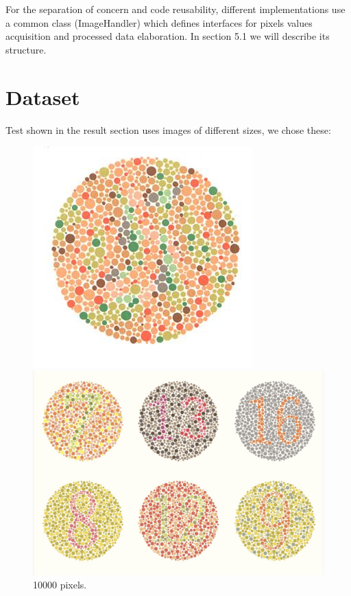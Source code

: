 \documentclass[10pt,twocolumn,letterpaper]{article}
\begin{document}
For the separation of concern and code reusability, different implementations use a common class (ImageHandler) which defines interfaces for pixels values acquisition and processed data elaboration. In section 5.1 we will describe its structure.

\section{Dataset}

Test shown in the  result section uses images of different sizes, we chose these:

\begin{figure}[H]
\begin{minipage}[b]{0.18\textwidth}
\centering
\includegraphics[width=\textwidth]{latex/100000p.jpg}
\caption{10000 pixels.}
\label{etichetta1}
\end{minipage}
\hfill
\begin{minipage}[b]{0.22\textwidth}
\centering
\includegraphics[width=\textwidth]{latex/1Mp.jpg}

\end{minipage}
\end{figure}
\end{document}
